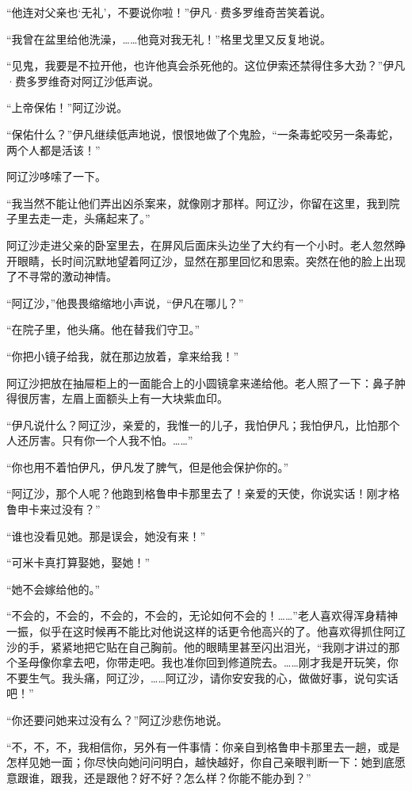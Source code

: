 \par “他连对父亲也‘无礼’，不要说你啦！”伊凡·费多罗维奇苦笑着说。
\par “我曾在盆里给他洗澡，……他竟对我无礼！”格里戈里又反复地说。
\par “见鬼，我要是不拉开他，也许他真会杀死他的。这位伊索还禁得住多大劲？”伊凡·费多罗维奇对阿辽沙低声说。
\par “上帝保佑！”阿辽沙说。
\par “保佑什么？”伊凡继续低声地说，恨恨地做了个鬼脸，“一条毒蛇咬另一条毒蛇，两个人都是活该！”
\par 阿辽沙哆嗦了一下。
\par “我当然不能让他们弄出凶杀案来，就像刚才那样。阿辽沙，你留在这里，我到院子里去走一走，头痛起来了。”
\par 阿辽沙走进父亲的卧室里去，在屏风后面床头边坐了大约有一个小时。老人忽然睁开眼睛，长时间沉默地望着阿辽沙，显然在那里回忆和思索。突然在他的脸上出现了不寻常的激动神情。
\par “阿辽沙，”他畏畏缩缩地小声说，“伊凡在哪儿？”
\par “在院子里，他头痛。他在替我们守卫。”
\par “你把小镜子给我，就在那边放着，拿来给我！”
\par 阿辽沙把放在抽屉柜上的一面能合上的小圆镜拿来递给他。老人照了一下：鼻子肿得很厉害，左眉上面额头上有一大块紫血印。
\par “伊凡说什么？阿辽沙，亲爱的，我惟一的儿子，我怕伊凡；我怕伊凡，比怕那个人还厉害。只有你一个人我不怕。……”
\par “你也用不着怕伊凡，伊凡发了脾气，但是他会保护你的。”
\par “阿辽沙，那个人呢？他跑到格鲁申卡那里去了！亲爱的天使，你说实话！刚才格鲁申卡来过没有？”
\par “谁也没看见她。那是误会，她没有来！”
\par “可米卡真打算娶她，娶她！”
\par “她不会嫁给他的。”
\par “不会的，不会的，不会的，不会的，无论如何不会的！……”老人喜欢得浑身精神一振，似乎在这时候再不能比对他说这样的话更令他高兴的了。他喜欢得抓住阿辽沙的手，紧紧地把它贴在自己胸前。他的眼睛里甚至闪出泪光，“我刚才讲过的那个圣母像你拿去吧，你带走吧。我也准你回到修道院去。……刚才我是开玩笑，你不要生气。我头痛，阿辽沙，……阿辽沙，请你安安我的心，做做好事，说句实话吧！”
\par “你还要问她来过没有么？”阿辽沙悲伤地说。
\par “不，不，不，我相信你，另外有一件事情：你亲自到格鲁申卡那里去一趟，或是怎样见她一面；你尽快向她问问明白，越快越好，你自己亲眼判断一下：她到底愿意跟谁，跟我，还是跟他？好不好？怎么样？你能不能办到？”

